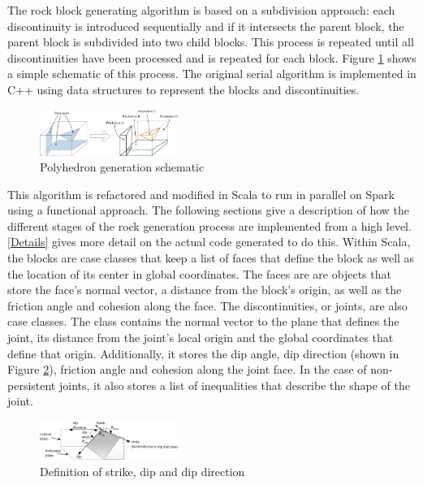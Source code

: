 The rock block generating algorithm is based on a subdivision approach: each discontinuity is introduced sequentially and if it intersects the parent block, the parent block is subdivided into two child blocks. This process is repeated until all discontinuities have been processed and is repeated for each block. Figure \ref{fig:SlicingIllustration} shows a simple schematic of this process. The original serial algorithm is implemented in C++ using data structures to represent the blocks and discontinuities. \par 

\begin{figure}[h]
  \centering
  \includegraphics[width=0.4\textwidth]{SlicingIllustration}
  \caption{Polyhedron generation schematic \cite{slicing}}
  \label{fig:SlicingIllustration}
\end{figure}

This algorithm is refactored and modified in Scala to run in parallel on Spark using a functional approach. The following sections give a description of how the different stages of the rock generation process are implemented from a high level. \ref{Details} gives more detail on the actual code generated to do this.  Within Scala, the blocks are case classes that keep a list of faces that define the block as well as the location of its center in global coordinates. The faces are are objects that store the face's normal vector, a distance from the block's origin, as well as the friction angle and cohesion along the face. The discontinuities, or joints, are also case classes. The class contains the normal vector to the plane that defines the joint, its distance from the joint's local origin and the global coordinates that define that origin. Additionally, it stores the dip angle, dip direction (shown in Figure \ref{fig:DipFig}), friction angle and cohesion along the joint face. In the case of non-persistent joints, it also stores a list of inequalities that describe the shape of the joint. 

\begin {figure}[h]
  \centering
  \includegraphics[width=0.4\textwidth]{DipFig}
  \caption{Definition of strike, dip and dip direction \cite{slicing}} 
  \label{fig:DipFig}           
\end{figure}


